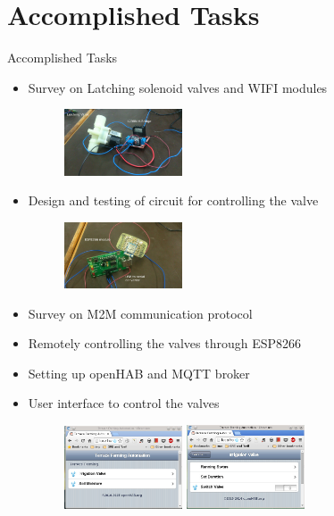 \documentclass[10pt, a4paper]{beamer}
\begin{document}
\section{Accomplished Tasks}
\begin{frame}{Accomplished Tasks}
        
	\begin{itemize}
		\item Survey on Latching solenoid valves and WIFI modules
		\begin{figure}
		 \includegraphics[width=3.5cm]{valve.jpg}
		\end{figure}
		\item Design and testing of circuit for controlling the valve
		\begin{figure}
		 \includegraphics[width=3.5cm]{ESP8266.jpg}
		\end{figure}
		\item Survey on M2M communication protocol
		\item Remotely controlling the valves through ESP8266 
		\item Setting up openHAB and MQTT broker
		\item User interface to control the valves
		\begin{figure}
		 \includegraphics[width=3.5cm]{openhab.jpg} \hspace{1cm}
		 \includegraphics[width=3.5cm]{openhab2.jpg} \\ 

\end{figure}
\end{itemize}
\end{frame}
\end{document}
